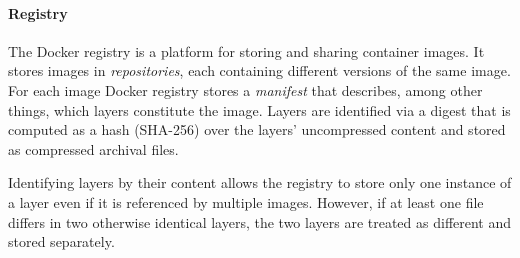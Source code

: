 

\paragraph{Registry}
%
The Docker registry is a platform for storing and sharing container images.
%
It stores images in \emph{repositories}, each containing different versions of
the same image. 
%
For each image Docker registry stores a \emph{manifest} that describes,
among other things, which layers constitute the image.
%
%
Layers are identified via a digest that is computed as a hash (SHA-256)
over the layers' uncompressed content and stored as compressed archival files.
%
%
%
%
%

%
Identifying layers by their content allows the registry to store only one instance
of a layer even if it is referenced by multiple images.
%
%
However, if at least one file differs in two otherwise identical layers,
the two layers are treated as different and stored separately.
